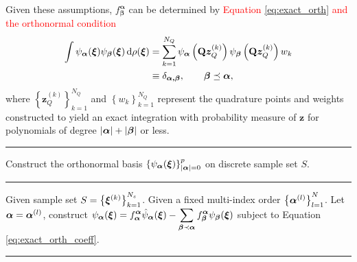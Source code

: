 Given these assumptions, $f_{\bm{\beta}}^{\bm{\alpha}}$ can be determined by \textcolor{red}{Equation \eqref{eq:exact_orth} and the orthonormal condition}
\begin{equation}
  \begin{split}
    \int \psi_{\bm{\alpha}}(\bm{\xi}) \psi_{\bm{\beta}}(\bm{\xi}) \,\mathrm{d} \rho(\bm\xi) &= \sum_{k=1}^{N_Q} \psi_{\bm{\alpha}}\left(\mathbf Q \bm{z}_Q^{(k)}\right) \psi_{\bm{\beta}}\left(\mathbf Q \bm{z}_Q^{(k)}\right) w_k \\
    &  \equiv \delta_{\bm{\alpha,\beta}}, \quad\quad \bm{\beta} \preceq \bm{\alpha},
  \end{split} \label{eq:exact_orth_coeff_quad}
\end{equation}
where $\left\{\bm z_Q^{(k)}\right\}_{k=1}^{N_Q}$ and $\left\{w_k\right\}_{k=1}^{N_Q}$ represent the quadrature points and weights constructed to yield an exact integration with probability measure of $\bm z$ for polynomials of degree $\vert \bm\alpha\vert + \vert \bm\beta\vert$ or less. 
\begin{algorithm}[htp]
  \hrule
  \caption{Construct the orthonormal  basis $\left\{ \psi_{\bm\alpha}(\bm\xi)\right\}_{\vert \bm\alpha \vert = 0}^p$ on discrete sample set $S$.}
  \vspace{5pt} \hrule \vspace{5pt}
\begin{algorithmic}[1]
    \State Given sample set  $S = \left\{\bm\xi^{(k)}\right\}_{k = 1}^{N_s}$.
    \State Given a fixed multi-index order $\left\{\bm\alpha^{(l)}\right\}_{l=1}^N$.
\State Let $\bm\alpha = \bm\alpha^{(l)}$, construct $\displaystyle \psi_{\bm{\alpha}}(\bm\xi) = f_{\bm{\alpha}}^{\bm{\alpha}} \hat{\psi}_{\bm\alpha}(\bm\xi) - \mathop{\sum}_{\bm{\beta} \prec \bm{\alpha}} f_{\bm{\beta}}^{\bm{\alpha}} \psi_{\bm{\beta}}(\bm\xi)$ subject to Equation \eqref{eq:exact_orth_coeff}.
\ENDFOR
\hrule
\end{algorithmic}
\label{alg:orth_discrete}
\end{algorithm}

